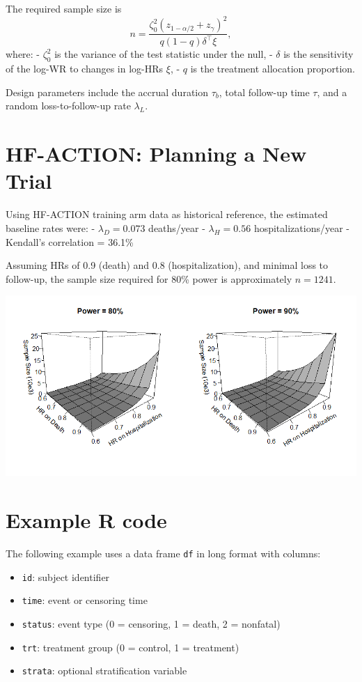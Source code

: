 \documentclass[
  letterpaper,
  DIV=11,
  numbers=noendperiod]{scrreprt}
\providecommand{\tightlist}{%
  \setlength{\itemsep}{0pt}\setlength{\parskip}{0pt}}\usepackage{longtable,booktabs,array}
\begin{document}
The required sample size is \[
n = \frac{\zeta_0^2(z_{1-\alpha/2} + z_\gamma)^2}{q(1-q)\delta^\top \xi},
\] where: - \(\zeta_0^2\) is the variance of the test statistic under
the null, - \(\delta\) is the sensitivity of the log-WR to changes in
log-HRs \(\xi\), - \(q\) is the treatment allocation proportion.

Design parameters include the accrual duration \(\tau_b\), total
follow-up time \(\tau\), and a random loss-to-follow-up rate
\(\lambda_L\).

\section{HF-ACTION: Planning a New
Trial}\label{hf-action-planning-a-new-trial}

Using HF-ACTION training arm data as historical reference, the estimated
baseline rates were: - \(\lambda_D = 0.073\) deaths/year -
\(\lambda_H = 0.56\) hospitalizations/year - Kendall's correlation =
36.1\%

Assuming HRs of 0.9 (death) and 0.8 (hospitalization), and minimal loss
to follow-up, the sample size required for 80\% power is approximately
\(n = 1241\).

\begin{center}
\includegraphics[width=0.9\linewidth,height=\textheight,keepaspectratio]{images/test_hfaction_ss.png}
\end{center}

\section{Example R code}\label{example-r-code}

The following example uses a data frame \texttt{df} in long format with
columns:

\begin{itemize}
\tightlist
\item
  \texttt{id}: subject identifier\\
\item
  \texttt{time}: event or censoring time\\
\item
  \texttt{status}: event type (0 = censoring, 1 = death, 2 = nonfatal)\\
\item
  \texttt{trt}: treatment group (0 = control, 1 = treatment)\\
\item
  \texttt{strata}: optional stratification variable
\end{itemize}
\end{document}
